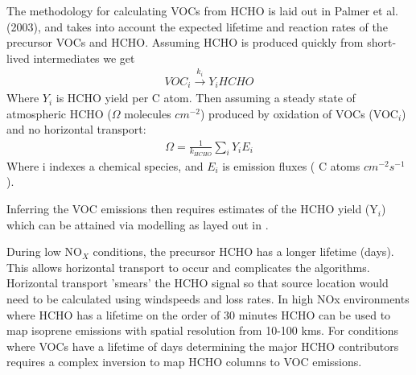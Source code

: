 The methodology for calculating VOCs from HCHO is laid out in Palmer et al. (2003), and takes into account the expected lifetime and reaction rates of the precursor VOCs and HCHO.
Assuming HCHO is produced quickly from short-lived intermediates we get
\begin{eqnarray*}
VOC_i \overset{k_i}{\rightarrow} Y_i HCHO
\end{eqnarray*}
Where $Y_i$ is HCHO yield per C atom.
Then assuming a steady state of atmospheric HCHO ($\Omega$ molecules $cm^{-2}$) produced by oxidation of VOCs (VOC$_i$) and no horizontal transport:
\begin{eqnarray*}
\Omega = \frac{1}{k_{HCHO}} \sum_{i} Y_i E_i
\end{eqnarray*}
Where i indexes a chemical species, and $E_i$ is emission fluxes ( C atoms $cm^{-2}s^{-1}$).

Inferring the VOC emissions then requires estimates of the HCHO yield (Y$_i$) which can be attained via modelling as layed out in \citet{Millet_2006}.

During low NO$_X$ conditions, the precursor HCHO has a longer lifetime (days).
This allows horizontal transport to occur and complicates the algorithms.
Horizontal transport 'smears' the HCHO signal so that source location would need to be calculated using windspeeds and loss rates.
In high NOx environments where HCHO has a lifetime on the order of 30 minutes HCHO can be used to map isoprene emissions with spatial resolution from 10-100 kms.
For conditions where VOCs have a lifetime of days determining the major HCHO contributors requires a complex inversion to map HCHO columns to VOC emissions.
